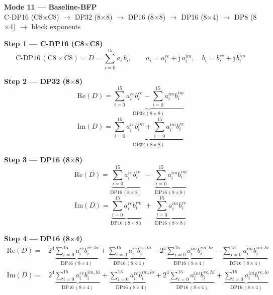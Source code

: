 \documentclass[fleqn]{article}
\newcommand{\DPop}[3]{\mathrm{DP#1}\,(#2\!\times\!#3)}
\begin{document}
\begin{center}
{\LARGE \textbf{Mode 11 --- Baseline-BFP}}\\[4pt]
{\large C-DP16 (C8$\times$C8) $\rightarrow$ DP32 (8$\times$8) $\rightarrow$ DP16 (8$\times$8) $\rightarrow$ DP16 (8$\times$4) $\rightarrow$ DP8 (8$\times$4) $\rightarrow$ block exponents}
\end{center}

\vspace{0.3em}

\textbf{Step 1 --- C-DP16 (C8$\times$C8)}
\[
\text{C-DP16}\,(\mathrm{C8}\!\times\!\mathrm{C8}) = D = \sum_{i=0}^{15} a_i \, b_i, \qquad
a_i = a_i^{re} + \mathrm{j}\,a_i^{im}, \quad
b_i = b_i^{re} + \mathrm{j}\,b_i^{im}
\]

\textbf{Step 2 --- DP32 (8$\times$8)}
\[
\mathrm{Re}(D) = \underbrace{\sum_{i=0}^{15} a_i^{re} b_i^{re}
  - \sum_{i=0}^{15} a_i^{im} b_i^{im}}_{\DPop{32}{8}{8}}
\]
\[
\mathrm{Im}(D) = \underbrace{\sum_{i=0}^{15} a_i^{re} b_i^{im}
  + \sum_{i=0}^{15} a_i^{im} b_i^{re}}_{\DPop{32}{8}{8}}
\]

\textbf{Step 3 --- DP16 (8$\times$8)}
\[
\mathrm{Re}(D) = \underbrace{\sum_{i=0}^{15} a_i^{re} b_i^{re}}_{\DPop{16}{8}{8}}
  \; - \; \underbrace{\sum_{i=0}^{15} a_i^{im} b_i^{im}}_{\DPop{16}{8}{8}}
\]
\[
\mathrm{Im}(D) = \underbrace{\sum_{i=0}^{15} a_i^{re} b_i^{im}}_{\DPop{16}{8}{8}}
  \; + \; \underbrace{\sum_{i=0}^{15} a_i^{im} b_i^{re}}_{\DPop{16}{8}{8}}
\]

\textbf{Step 4 --- DP16 (8$\times$4)}
\begin{align*}
\mathrm{Re}(D) = {}
  & 2^{4} \underbrace{\sum_{i=0}^{15} a_i^{re} b_i^{re,hi}}_{\DPop{16}{8}{4}}
  + \underbrace{\sum_{i=0}^{15} a_i^{re} b_i^{re,lo}}_{\DPop{16}{8}{4}}
  - 2^{4} \underbrace{\sum_{i=0}^{15} a_i^{im} b_i^{im,hi}}_{\DPop{16}{8}{4}}
  - \underbrace{\sum_{i=0}^{15} a_i^{im} b_i^{im,lo}}_{\DPop{16}{8}{4}}
\end{align*}
\begin{align*}
\mathrm{Im}(D) = {}
  & 2^{4} \underbrace{\sum_{i=0}^{15} a_i^{re} b_i^{im,hi}}_{\DPop{16}{8}{4}}
  + \underbrace{\sum_{i=0}^{15} a_i^{re} b_i^{im,lo}}_{\DPop{16}{8}{4}}
  + 2^{4} \underbrace{\sum_{i=0}^{15} a_i^{im} b_i^{re,hi}}_{\DPop{16}{8}{4}}
  + \underbrace{\sum_{i=0}^{15} a_i^{im} b_i^{re,lo}}_{\DPop{16}{8}{4}}
\end{align*}
\end{document}
